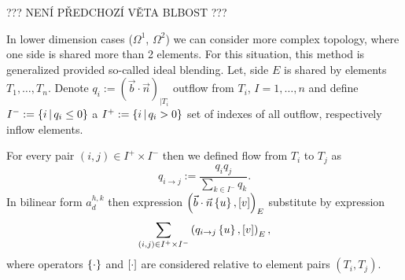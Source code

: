 ??? NENÍ PŘEDCHOZÍ VĚTA BLBOST ???

In lower dimension cases ($\Omega^1$, $\Omega^2$) we can consider more complex topology,
 where one side is shared more than 2 elements.
For this situation, this method is generalized provided so-called ideal blending.
Let, side $E$ is shared by elements $T_1,\ldots,T_n$.
Denote $q_i:=(\vec b\cdot\vec n)_{|T_i}$ outflow from $T_i$, $I=1,\ldots,n$
 and define $I^-:=\{i\,|\, q_i\le 0\}$ a $I^+:=\{i\,|\, q_i>0\}$
 set of indexes of all outflow, respectively inflow elements.

For every pair $(i,j)\in I^+\times I^-$ then we defined flow from $T_i$ to $T_j$ as
$$ q_{i\to j} := \frac{q_i q_j}{\sum_{k\in I^-}{q_k}}.$$
In bilinear form $a_d^{h,k}$ then expression $\left(\vec b\cdot\vec n\left\{u\right\},[v]\right)_E$ substitute by expression
$$ \sum_{(i,j)\in I^+\times I^-}\left(q_{i\to j}\left\{u\right\},[v]\right)_E, $$
where operators $\left\{\cdot\right\}$ and $[\cdot]$ are considered relative to element pairs $(T_i,T_j)$.
